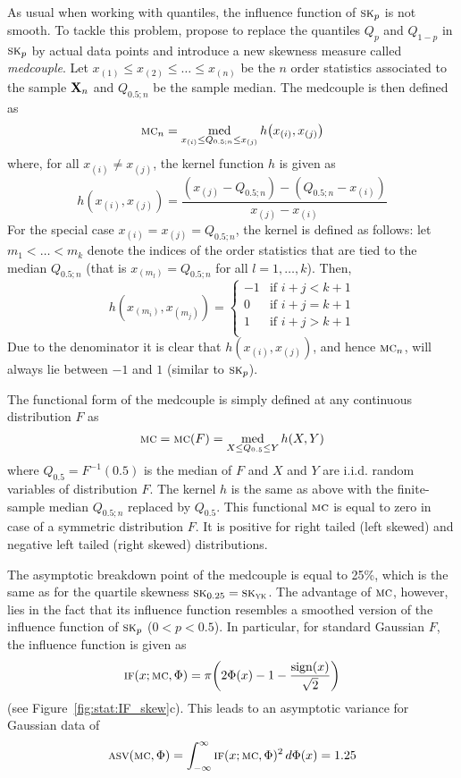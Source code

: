 As usual when working with quantiles, the influence function of $\stsc{SK}_p$
is not smooth. To tackle this problem, \citet{brys:etal:2004a} propose to
replace the quantiles $Q_p$ and $Q_{1-p}$ in $\stsc{SK}_p$ by actual data
points and introduce a new skewness measure called \emph{medcouple}. 
Let $x_{(1)}\leq x_{(2)}\leq\dots\leq x_{(n)}$ be the $n$ order
statistics associated to the sample $\mathbf X_n$ and $Q_{0.5;n}$ be 
the sample median. The medcouple is then defined as
\[
    \stsc{MC}_n =\med_{x_{(i)} \leq Q_{0.5;n} \leq x_{(j)}} 
    h \left(x_{(i)}, x_{(j)}\right)
\]
where, for all $x_{(i)} \neq x_{(j)}$, the kernel function $h$ is given as
\[
    h\left(x_{(i)}, x_{(j)}\right) = 
    \frac{\left(x_{(j)} - Q_{0.5;n}\right) - \left(Q_{0.5;n} - x_{(i)}\right)}{x_{(j)}-x_{(i)}}
\]
For the special case $x_{(i)}=x_{(j)}=Q_{0.5;n}$, the kernel is defined as
follows: let $m_1 < \dots < m_{k}$ denote the indices of the order statistics
that are tied to the median $Q_{0.5;n}$ (that is $x_{(m_{l})}  =Q_{0.5;n}$ for
all $l=1,\dots,k$). Then,
\[
    h \left(x_{(m_i)}, x_{(m_j)}\right) =
    \begin{cases}
        -1  & \text{if $i+j<k+1$}\\
        0   & \text{if $i+j=k+1$}\\
        1   & \text{if $i+j>k+1$}\\
    \end{cases}
\]
Due to the denominator it is clear that $h\left(x_{(i)}, x_{(j)}\right)$, 
and hence $\stsc{MC}_n$, will always lie between $-1$ and $1$ (similar to
$\stsc{SK}_p$).

The functional form of the medcouple is simply defined at any continuous
distribution $F$ as 
\[
    \stsc{MC} = \stsc{MC}(F) = \med_{X \leq Q_{0.5} \leq Y} h(X,Y)
\]
where $Q_{0.5}=F^{-1}(0.5)$ is the median of $F$ and $X$ and $Y$ are i.i.d.
random variables of distribution $F$. The kernel $h$ is the same as above with
the finite-sample median $Q_{0.5;n}$ replaced by $Q_{0.5}$. This functional
$\stsc{MC}$ is equal to zero in case of a symmetric distribution $F$. It is
positive for right tailed (left skewed) and negative left tailed (right skewed)
distributions.

The asymptotic breakdown point of the medcouple is equal to 25\%, which is the
same as for the quartile skewness $\stsc{SK}_{0.25}=\stsc{SK}_\stsc{YK}$. 
The advantage of $\stsc{MC}$, however, lies in the fact that its
influence function resembles a smoothed version of the influence function
of $\stsc{SK}_p$ ($0<p<0.5$). In particular, for standard Gaussian $F$, the    
influence function is given as
\[
    \stsc{IF}(x; \stsc{MC}, \Phi) = \pi \left(2\Phi(x) - 1 - \frac{\sign(x)}{\sqrt{2}}\right)
\]
(see Figure~\ref{fig:stat:IF_skew}c). This leads to an asymptotic variance for
Gaussian data of                                                                
\[
    \stsc{ASV}(\stsc{MC}, \Phi) = \int_{-\infty}^{\infty} \stsc{IF}(x;\stsc{MC},\Phi)^2 \dif \Phi(x) = 1.25
\]


